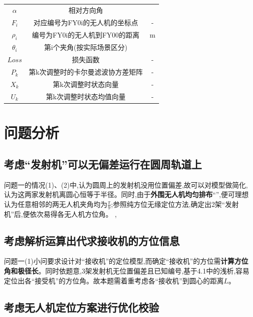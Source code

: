 \documentclass[withoutpreface,bwprint]{cumcmthesis} %
\begin{document}
	\begin{center}
		\small
		\renewcommand\arraystretch{3}
		\begin{tabular}{ccc}
			\hline
			\makebox[0.25\textwidth][c]{符号}	& \makebox[0.35\textwidth][c]{意义} & \makebox[0.2\textwidth][c]{单位}	 \\ \hline
			$\alpha$	    & 相对方向角 & \textdegree  \\ \hline
				$F_{i}$	    & 对应编号为FY0i的无人机的坐标点 &  -\\ \hline
					$\rho_{i}$	    & 编号为FY0i的无人机到FY00的距离 & m  \\ \hline
						$\theta_{i}$	    & 第i个夹角(按实际场景区分)& \textdegree  \\ \hline
							$Loss$	    &损失函数& -  \\ \hline	
							$P_{k}$	    & 第k次调整时的卡尔曼滤波协方差矩阵& 	-  \\ \hline
								$X_{k}$	    & 第k次调整时状态向量& - 	 \\ \hline
									$U_{k}$	    & 第k次调整时状态均值向量& - 	 \\ \hline
		\end{tabular}
		
	\end{center}
	\section{问题分析}
	
	\subsection{考虑“发射机”可以无偏差运行在圆周轨道上}
		
		问题一的情况(1)、(2)中,认为圆周上的发射机没用位置偏差,故可以对模型做简化,认为这两家发射机离圆心恒等于半径。同时,由于\textbf{外围无人机均匀排布}“”,便可理想认为任意相邻的两无人机夹角均为$\frac{\pi}{9}$;参照纯方位无缘定位方法,确定出2架“发射机”后,便依次易得各无人机方位角。
		,
	\subsection{考虑解析运算出代求接收机的方位信息}
	
		问题一(1)小问要求设计对“接收机”的定位模型,而确定“接收机”的方位需\textbf{计算方位角和极径长}。同时依题意,3架发射机无位置偏差且已知编号,基于4.1中的浅析,容易定位出各“接受机”的方位角。故本题需着重考虑各“接收机”到圆心的距离$L$。
	
	\subsection{考虑无人机定位方案进行优化校验}
	
\end{document}
